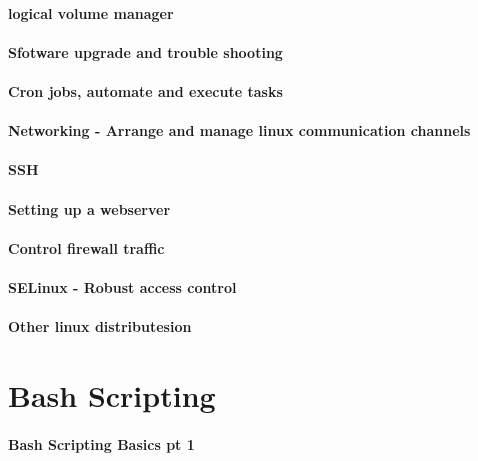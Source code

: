 \documentclass[a4paper, 11pt]{book}
\begin{document}
    \subsubsection{logical volume manager}

    \subsubsection{Sfotware upgrade and trouble shooting}

    \subsubsection{Cron jobs, automate and execute tasks}

    \subsubsection{Networking - Arrange and manage linux communication channels}

    \subsubsection{SSH}

    \subsubsection{Setting up a webserver}

    \subsubsection{Control firewall traffic}

    \subsubsection{SELinux - Robust access control}

    \subsubsection{Other linux distributesion}


    \chapter{Bash Scripting}

    \subsubsection{Bash Scripting Basics pt 1}
\end{document}
